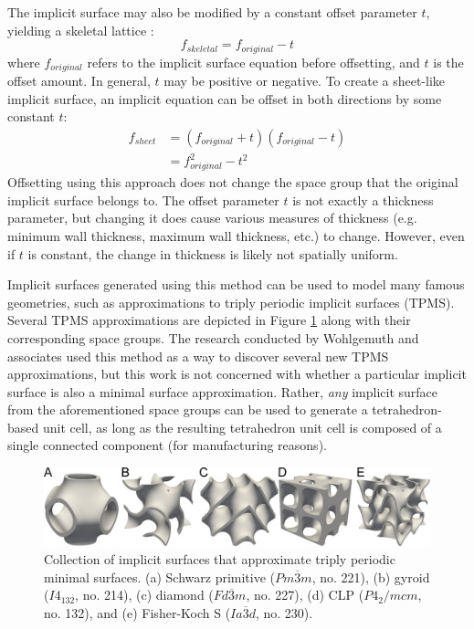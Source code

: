 \documentclass{article}
\begin{document}
The implicit surface may also be modified by a constant offset parameter $t$, yielding a skeletal lattice \cite{al2018topology}:
\begin{equation}
    f_{skeletal} = f_{original} - t
\end{equation}
where $f_{original}$ refers to the implicit surface equation before offsetting, and $t$ is the offset amount. In general, $t$ may be positive or negative. To create a sheet-like implicit surface, an implicit equation can be offset in both directions by some constant $t$:
\begin{equation}
    \begin{split}
        f_{sheet} & = \left(f_{original} + t\right)\left(f_{original} - t\right) \\
        & = f_{original}^2 - t^2
    \end{split}
\end{equation}
Offsetting using this approach does not change the space group that the original implicit surface belongs to. The offset parameter $t$ is not exactly a thickness parameter, but changing it does cause various measures of thickness (e.g. minimum wall thickness, maximum wall thickness, etc.) to change. However, even if $t$ is constant, the change in thickness is likely not spatially uniform.

Implicit surfaces generated using this method can be used to model many famous geometries, such as approximations to triply periodic implicit surfaces (TPMS). Several TPMS approximations are depicted in Figure \ref{fig:cubic_lineup} along with their corresponding space groups. The research conducted by Wohlgemuth and associates \cite{wohlgemuth2001triply} used this method as a way to discover several new TPMS approximations, but this work is not concerned with whether a particular implicit surface is also a minimal surface approximation. Rather, \textit{any} implicit surface from the aforementioned space groups can be used to generate a tetrahedron-based unit cell, as long as the resulting tetrahedron unit cell is composed of a single connected component (for manufacturing reasons).

\begin{figure}
    \centering
    \includegraphics[width=\linewidth]{figures/cubic_lineup.eps}
    \caption{Collection of implicit surfaces that approximate triply periodic minimal surfaces. (a) Schwarz primitive ($Pm\overline{3}m$, no. 221), (b) gyroid ($I4_132$, no. 214), (c) diamond ($Fd\overline{3}m$, no. 227), (d) CLP ($P4_2/mcm$, no. 132), and (e) Fisher-Koch S ($Ia\overline{3}d$, no. 230).}
    \label{fig:cubic_lineup}
\end{figure}
\end{document}
